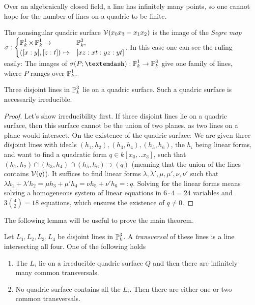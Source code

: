 \begin{remark}
Over an algebraically closed field, a line has infinitely many points, so one cannot hope for the number of lines on a quadric to be finite.
\end{remark}

\begin{remark}
The nonsingular quadric surface $\operatorname{\mathcal V}(x_0x_3 - x_1x_2)$ is the image of the \emph{Segre map} $\sigma : \begin{cases} \operatorname{\mathbb P}^1_k \times \operatorname{\mathbb P}^1_k \to& \operatorname{\mathbb P}^3_k,  \\ ([x:y],[z:t]) \mapsto& [xz:xt:yz:yt] \end{cases}$.
In this case one can see the ruling easily: The images of
$\sigma(P;\textemdash) : \proj^1_k \to \proj^3_k$ give one family of lines, where $P$ ranges over $\operatorname{\mathbb P}^1_k$.
\end{remark}


\begin{lemma} \label{lemmaThreeLines}
Three disjoint lines in $\operatorname{\mathbb P}^3_k$ lie on a quadric surface.
Such a quadric surface is necessarily irreducible.
\end{lemma}
\begin{proof}
Let's show irreducibility first.
If three disjoint lines lie on a quadric surface, then this surface cannot be the union of two planes, as two lines on a plane would intersect.
On the existence of the quadric surface:
We are given three disjoint lines with ideals $(h_1,h_2), (h_3,h_4), (h_5,h_6)$, the $h_i$ being linear forms, and want to find a quadratic form $q \in k[x_0,..x_3]$, such that $(h_1,h_2) \cap (h_3,h_4) \cap (h_5,h_6) \supset (q)$ (meaning that the union of the lines contains $\operatorname{\mathcal V}(q)$).
It suffices to find linear forms $\lambda,\lambda',\mu,\mu',\nu,\nu'$ such that
$\lambda h_1 + \lambda' h_2 = \mu h_3 + \mu' h_4 = \nu h_5 + \nu' h_6 =: q$.
Solving for the linear forms means solving a homogeneous system of linear equations in $6\cdot 4= 24$ variables and $3\binom{4}{2} = 18$ equations, which ensures the existence of $q \neq 0$.
\end{proof}

The following lemma will be useful to prove the main theorem.
\begin{lemma} \label{lemmaDisjointLines}
Let $L_1,L_2,L_3,L_4$ be disjoint lines in $\operatorname{\mathbb P}^3_k$.
A \emph{transversal} of these lines is a line intersecting all four.
One of the following holds
\begin{enumerate}
\item The $L_i$ lie on a irreducible quadric surface $Q$ and then there are infinitely many common transversals.
\item No quadric surface contains all the $L_i$. Then there are either one or two common transversals.
\end{enumerate}
\end{lemma}

